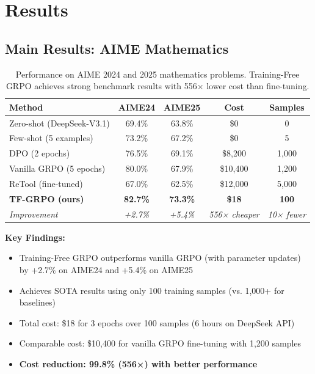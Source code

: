 \section{Results}

\label{sec:results}

\subsection{Main Results: AIME Mathematics}

\begin{table}[h]
\centering
\caption{Performance on AIME 2024 and 2025 mathematics problems. Training-Free GRPO achieves strong benchmark results with 556× lower cost than fine-tuning.}
\label{tab:aime}
\begin{tabular}{@{}lcccc@{}}
\toprule
\textbf{Method} & \textbf{AIME24} & \textbf{AIME25} & \textbf{Cost} & \textbf{Samples} \\
\midrule
Zero-shot (DeepSeek-V3.1) & 69.4\% & 63.8\% & \$0 & 0 \\
Few-shot (5 examples) & 73.2\% & 67.2\% & \$0 & 5 \\
\midrule
DPO (2 epochs) & 76.5\% & 69.1\% & \$8,200 & 1,000 \\
Vanilla GRPO (5 epochs) & 80.0\% & 67.9\% & \$10,400 & 1,200 \\
ReTool (fine-tuned) & 67.0\% & 62.5\% & \$12,000 & 5,000 \\
\midrule
\textbf{TF-GRPO (ours)} & \textbf{82.7\%} & \textbf{73.3\%} & \textbf{\$18} & \textbf{100} \\
\quad \textit{Improvement} & \textit{+2.7\%} & \textit{+5.4\%} & \textit{556× cheaper} & \textit{10× fewer} \\
\bottomrule
\end{tabular}
\end{table}

\textbf{Key Findings:}
\begin{itemize}
    \item Training-Free GRPO outperforms vanilla GRPO (with parameter updates) by +2.7\% on AIME24 and +5.4\% on AIME25
    \item Achieves SOTA results using only 100 training samples (vs. 1,000+ for baselines)
    \item Total cost: \$18 for 3 epochs over 100 samples (6 hours on DeepSeek API)
    \item Comparable cost: \$10,400 for vanilla GRPO fine-tuning with 1,200 samples
    \item \textbf{Cost reduction: 99.8\% (556×) with better performance}
\end{itemize}


